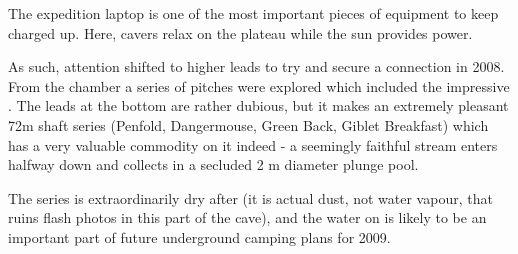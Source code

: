 \begin{marginfigure}
\caption{The expedition laptop is one of the most important pieces of equipment to keep charged up. Here, cavers relax on the plateau while the sun provides power. }
\end{marginfigure}


As such, attention shifted to higher leads to try and secure a
connection in 2008. From the  chamber a series of
pitches were explored which included the impressive . The leads at the bottom are rather dubious, but it makes an
extremely pleasant 72m shaft series (Penfold, Dangermouse, Green
Back, Giblet Breakfast) which has a very valuable commodity on it indeed
- a seemingly faithful stream enters halfway down  and
collects in a secluded 2 m diameter plunge pool.

The  series is extraordinarily dry after
 (it is actual dust, not water vapour, that ruins
flash photos in this part of the cave), and the water on
 is likely to be an important part of future
underground camping plans for 2009.

